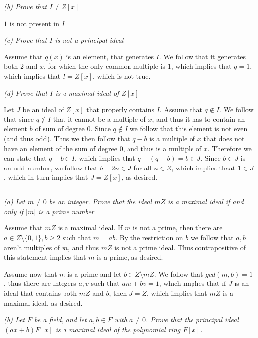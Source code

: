 \documentclass[11pt,oneside,titlepage]{book}
\newcommand{\set}[1]{\{ #1 \}}
\begin{document}
\textit{(b) Prove that $I \neq Z[x]$}

$1$ is not present in $I$

\textit{(c) Prove that $I$ is not a principal ideal}

Assume that $q(x)$ is an element, that generates $I$. We follow that
it generates both $2$ and $x$, for which the only common multiple is
$1$, which implies that $q = 1$, which implies that $I = Z[x]$, which
is not true.

\textit{(d) Prove that $I$ is a maximal ideal of $Z[x]$}

Let $J$ be an ideal of $Z[x]$ that properly contains $I$.  Assume that
$q \notin I$. We follow that since $q \notin I$ that it cannot be a
multiple of $x$, and thus it has to contain an element $b$ of sum of
degree $0$. Since $q \notin I$ we follow that this element is not even
(and thus odd). Thus we then follow that $q - b$ is a multiple of $x$
that does not have an element of the sum of degree $0$, and thus is a
multiple of $x$. Therefore we can state that $q - b \in I$, which
implies that $q - (q - b) = b \in J$. Since $b \in J$ is an odd
number, we follow that $b - 2n \in J$ for all $n \in Z$, which implies
thaat $1 \in J$, which in turn implies that $J = Z[x]$, as desired.

\subsection{}

\textit{(a) Let $m \neq 0$ be an integer. Prove that the ideal $mZ$ is
a maximal ideal if and only if $|m|$ is a prime number}

Assume that $mZ$ is a maximal ideal. If $m$ is not a prime, then there
are $a \in Z \setminus \set{0, 1}, b \geq 2$ such that $m = ab$. By
the restriction on $b$ we follow that $a, b$ aren't multiples of $m$,
and thus $mZ$ is not a prime ideal.  Thus contrapositive of this
statement implies that $m$ is a prime, as desired.

Assume now that $m$ is a prime and let $b \in Z \setminus mZ$. We
follow that $gcd(m, b) = 1$, thus there are integers $a, v$ such that
$am + bv = 1$, which implies that if $J$ is an ideal that contains
both $mZ$ and $b$, then $J = Z$, which implies that $mZ$ is a maximal
ideal, as desired.

\textit{(b) Let $F$ be a field, and let $a, b \in F$ with $a \neq
0$. Prove that the principal ideal $(ax + b)F[x]$ is a maximal ideal
of the polynomial ring $F[x]$.}
\end{document}

